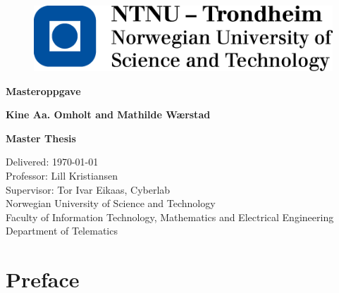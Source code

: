 \documentclass[b5paper,twoside,openright,11pt]{report}
\begin{document}
\begin{flushleft}
\begin{figure}[htb]
\includegraphics[scale=0.6]{NTNU-logo}
\end{figure}
\bigskip
\bigskip
\bigskip
\bigskip
\begin{huge}
\textbf{Masteroppgave}\\
\end{huge} 
\bigskip
\bigskip
\bigskip
\bigskip
\bigskip
\bigskip
\bigskip
\begin{Large}
\textbf{Kine Aa. Omholt and Mathilde Wærstad \\}
\end{Large}
\bigskip
\bigskip
\bigskip
\bigskip
\bigskip
\bigskip
\begin{large}
\textbf{Master Thesis\\}
\end{large}
Delivered: \today\\
Professor: Lill Kristiansen\\
Supervisor: Tor Ivar Eikaas, Cyberlab\\
\bigskip
\bigskip
\bigskip
\bigskip
\bigskip
Norwegian University of Science and Technology\\ 
Faculty of Information Technology, Mathematics and Electrical Engineering\\
Department of Telematics
\end{flushleft}
\cleardoublepage
\begin{abstract}

\end{abstract}
\cleardoublepage
\chapter*{Preface}

\cleardoublepage
{}
\tableofcontents
\cleardoublepage
\listoffigures
\cleardoublepage
\listoftables
\cleardoublepage
{}
\pagestyle{fancy}
\fancyhead[LE]{\thepage}
\fancyhead[RE]{\leftmark}
\fancyhead[RO]{\thepage}
\fancyhead[LO]{\rightmark}
\fancyfoot{}

\cleardoublepage

\cleardoublepage

\cleardoublepage

\cleardoublepage

\cleardoublepage

\cleardoublepage

\cleardoublepage

\cleardoublepage


\pagestyle{plain}
\cleardoublepage
\appendix 
{}
\cleardoublepage
\end{document}
